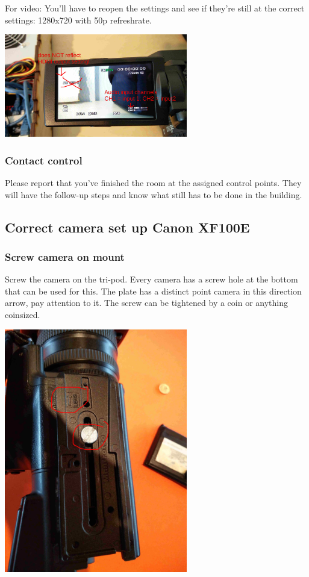 \documentclass{article}
\begin{document}
For video: You'll have to reopen the settings and see if they're still at the correct settings: 1280x720 
with 50p refreshrate.

\includegraphics[width = 80mm]{Sony06.jpg}

\subsubsection{Contact control}
Please report that you've finished the room at the assigned control points. They will have the follow-up steps and know what still has to be done in the building.

\subsection{Correct camera set up Canon XF100E}

\subsubsection{Screw camera on mount}
Screw the camera on the tri-pod. Every camera has a screw hole at the bottom that can be used for this. The plate has a distinct point camera in this direction arrow, pay attention to it. The screw can be tightened by a coin or anything coinsized.

\includegraphics[width = 80mm]{Cam00.jpg}
\end{document}
